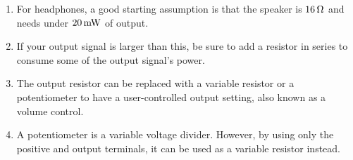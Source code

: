 \begin{enumerate}
\item For headphones, a good starting assumption is that the speaker is $16\,\si{\ohm}$ and needs under $20\,\si{\milli\watt}$ of output.
\item If your output signal is larger than this, be sure to add a resistor in series to consume some of the output signal's power.
\item The output resistor can be replaced with a variable resistor or a potentiometer to have a user-controlled output setting, also known as a volume control.
\item A potentiometer is a variable voltage divider.  However, by using only the positive and output terminals, it can be used as a variable resistor instead.
\end{enumerate}

\applysection


